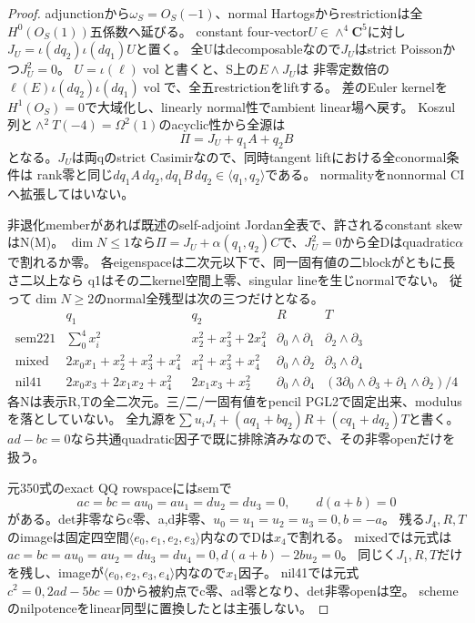 \documentclass[a4paper,11pt]{ltjsarticle}
\theoremstyle{definition}
\newcommand{\CC}{\mathbf C}
\begin{document}
\begin{proof}
adjunctionから$\omega_S=O_S(-1)$、normal Hartogsからrestrictionは全$H^0(O_S(1))$五係数へ延びる。
constant four-vector$U\in\wedge^4\CC^5$に対し$J_U=\iota(dq_2)\iota(dq_1)U$と置く。
全Uはdecomposableなので$J_U$はstrict Poissonかつ$J_U^2=0$。
$U=\iota(\ell)\operatorname{vol}$と書くと、S上の$E\wedge J_U$は
非零定数倍の$\ell(E)\iota(dq_2)\iota(dq_1)\operatorname{vol}$で、全五restrictionをliftする。
差のEuler kernelを$H^1(O_S)=0$で大域化し、linearly normal性でambient linear場へ戻す。
Koszul列と$\wedge^2T(-4)=\Omega^2(1)$のacyclic性から全源は
\[
 \Pi=J_U+q_1A+q_2B
\]
となる。$J_U$は両qのstrict Casimirなので、同時tangent liftにおける全conormal条件は
rank零と同じ$dq_1A\,dq_2,dq_1B\,dq_2\in\langle q_1,q_2\rangle$である。
normalityをnonnormal CIへ拡張してはいない。

非退化memberがあれば既述のself-adjoint Jordan全表で、許されるconstant skewはN(M)。
$\dim N\le1$なら$\Pi=J_U+\alpha(q_1,q_2)C$で、$J_U^2=0$から全Dはquadratic$\alpha$で割れるか零。
各eigenspaceは二次元以下で、同一固有値の二blockがともに長さ二以上なら
q1はその二kernel空間上零、singular lineを生じnormalでない。
従って$\dim N\ge2$のnormal全残型は次の三つだけとなる。
\[
\begin{array}{c|c|c|c|c}
 &q_1&q_2&R&T\\\hline
 \mathrm{sem221}&\sum_0^4x_i^2&x_2^2+x_3^2+2x_4^2&\partial_0\wedge\partial_1&\partial_2\wedge\partial_3\\
 \mathrm{mixed}&2x_0x_1+x_2^2+x_3^2+x_4^2&x_1^2+x_3^2+x_4^2&\partial_0\wedge\partial_2&\partial_3\wedge\partial_4\\
 \mathrm{nil41}&2x_0x_3+2x_1x_2+x_4^2&2x_1x_3+x_2^2&\partial_0\wedge\partial_4&(3\partial_0\wedge\partial_3+\partial_1\wedge\partial_2)/4
\end{array}
\]
各Nは表示R,Tの全二次元。三/二/一固有値をpencil PGL2で固定出来、modulusを落としていない。
全九源を$\sum u_iJ_i+(aq_1+bq_2)R+(cq_1+dq_2)T$と書く。
$ad-bc=0$なら共通quadratic因子で既に排除済みなので、その非零openだけを扱う。

元350式のexact QQ rowspaceにはsemで
\[
 ac=bc=au_0=au_1=du_2=du_3=0,\qquad d(a+b)=0
\]
がある。det非零ならc零、a,d非零、$u_0=u_1=u_2=u_3=0,b=-a$。
残る$J_4,R,T$のimageは固定四空間$\langle e_0,e_1,e_2,e_3\rangle$内なのでDは$x_4$で割れる。
mixedでは元式は$ac=bc=au_0=au_2=du_3=du_4=0,d(a+b)-2bu_2=0$。
同じく$J_1,R,T$だけを残し、imageが$\langle e_0,e_2,e_3,e_4\rangle$内なので$x_1$因子。
nil41では元式$c^2=0,2ad-5bc=0$から被約点でc零、ad零となり、det非零openは空。
schemeのnilpotenceをlinear同型に置換したとは主張しない。


\end{proof}
\end{document}
